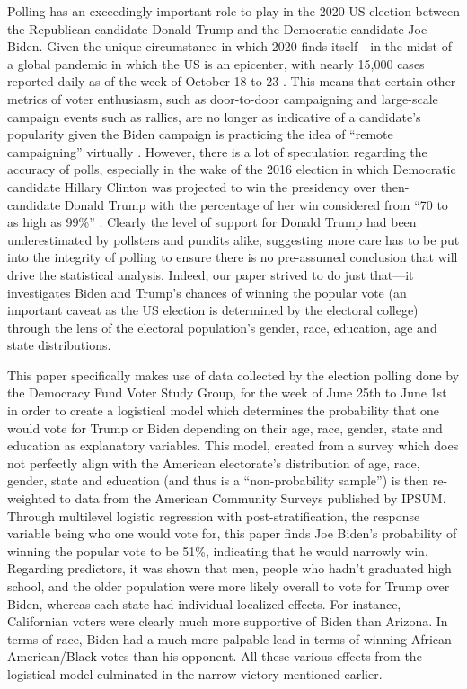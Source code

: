 \documentclass[
]{article}
\begin{document}
Polling has an exceedingly important role to play in the 2020 US election between the Republican candidate Donald Trump and the Democratic candidate Joe Biden. Given the unique circumstance in which 2020 finds itself---in the midst of a global pandemic in which the US is an epicenter, with nearly 15,000 cases reported daily as of the week of October 18 to 23 \citep{citeHipes}. This means that certain other metrics of voter enthusiasm, such as door-to-door campaigning and large-scale campaign events such as rallies, are no longer as indicative of a candidate's popularity given the Biden campaign is practicing the idea of ``remote campaigning'' virtually \citep{citeForgey}. However, there is a lot of speculation regarding the accuracy of polls, especially in the wake of the 2016 election in which Democratic candidate Hillary Clinton was projected to win the presidency over then-candidate Donald Trump with the percentage of her win considered from ``70 to as high as 99\%'' \citep{citePew}. Clearly the level of support for Donald Trump had been underestimated by pollsters and pundits alike, suggesting more care has to be put into the integrity of polling to ensure there is no pre-assumed conclusion that will drive the statistical analysis. Indeed, our paper strived to do just that---it investigates Biden and Trump's chances of winning the popular vote (an important caveat as the US election is determined by the electoral college) through the lens of the electoral population's gender, race, education, age and state distributions.

This paper specifically makes use of data collected by the election polling done by the Democracy Fund Voter Study Group, for the week of June 25th to June 1st in order to create a logistical model which determines the probability that one would vote for Trump or Biden depending on their age, race, gender, state and education as explanatory variables. This model, created from a survey which does not perfectly align with the American electorate's distribution of age, race, gender, state and education (and thus is a ``non-probability sample'') is then re-weighted to data from the American Community Surveys published by IPSUM. Through multilevel logistic regression with post-stratification, the response variable being who one would vote for, this paper finds Joe Biden's probability of winning the popular vote to be 51\%, indicating that he would narrowly win. Regarding predictors, it was shown that men, people who hadn't graduated high school, and the older population were more likely overall to vote for Trump over Biden, whereas each state had individual localized effects. For instance, Californian voters were clearly much more supportive of Biden than Arizona. In terms of race, Biden had a much more palpable lead in terms of winning African American/Black votes than his opponent. All these various effects from the logistical model culminated in the narrow victory mentioned earlier.
\end{document}
